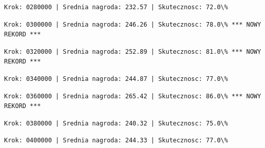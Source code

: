 \documentclass[11pt]{article}
\begin{document}
    
    
    \begin{Verbatim}[commandchars=\\\{\}]
Krok: 0280000 | Srednia nagroda: 232.57 | Skutecznosc: 72.0\%

    \end{Verbatim}

    
    
    \begin{Verbatim}[commandchars=\\\{\}]
Krok: 0300000 | Srednia nagroda: 246.26 | Skutecznosc: 78.0\% *** NOWY REKORD ***

    \end{Verbatim}

    
    
    \begin{Verbatim}[commandchars=\\\{\}]
Krok: 0320000 | Srednia nagroda: 252.89 | Skutecznosc: 81.0\% *** NOWY REKORD ***

    \end{Verbatim}

    
    
    \begin{Verbatim}[commandchars=\\\{\}]
Krok: 0340000 | Srednia nagroda: 244.87 | Skutecznosc: 77.0\%

    \end{Verbatim}

    
    
    \begin{Verbatim}[commandchars=\\\{\}]
Krok: 0360000 | Srednia nagroda: 265.42 | Skutecznosc: 86.0\% *** NOWY REKORD ***

    \end{Verbatim}

    
    
    \begin{Verbatim}[commandchars=\\\{\}]
Krok: 0380000 | Srednia nagroda: 240.32 | Skutecznosc: 75.0\%

    \end{Verbatim}

    
    
    \begin{Verbatim}[commandchars=\\\{\}]
Krok: 0400000 | Srednia nagroda: 244.33 | Skutecznosc: 77.0\%

    \end{Verbatim}
\end{document}
